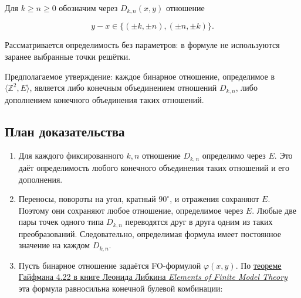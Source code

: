 Для $k\ge n\ge0$ обозначим через $D_{k,n}(x,y)$ отношение

$$
y-x\in\{(\pm k,\pm n),(\pm n,\pm k)\}.
$$

Рассматривается определимость без параметров: в формуле не используются
заранее выбранные точки решётки.

Предполагаемое утверждение: каждое бинарное отношение, определимое в
$\langle\mathbb Z^2,E\rangle$, является либо конечным объединением отношений $D_{k,n}$, либо
дополнением конечного объединения таких отношений.

\subsection{План доказательства}

\begin{enumerate}
\def\labelenumi{\arabic{enumi}.}
\item
  Для каждого фиксированного $k,n$ отношение $D_{k,n}$ определимо через $E$.
  Это даёт определимость любого конечного объединения таких отношений и его дополнения.
\item
  Переносы, повороты на угол, кратный $90^\circ$, и отражения сохраняют $E$.
  Поэтому они сохраняют любое отношение, определимое через $E$. Любые две пары
  точек одного типа $D_{k,n}$ переводятся друг в друга одним из таких
  преобразований. Следовательно, определимая формула имеет постоянное значение
  на каждом $D_{k,n}$.
\item
  Пусть бинарное отношение задаётся FO-формулой $\varphi(x,y)$. По
  \href{https://homepages.inf.ed.ac.uk/libkin/fmt/fmt.pdf}{теореме Гайфмана 4.22 в книге Леонида Либкина \emph{Elements of Finite Model Theory}}
  эта формула равносильна конечной булевой комбинации:


\end{enumerate}
